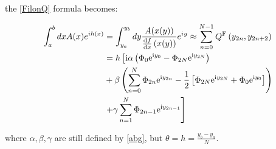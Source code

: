 the \eqref{FilonQ} formula becomes:

\begin{equation}
    \begin{aligned}
        \int_{a}^{b}dxA(x)e^{ih(x)} &= \int_{y_a}^{y_b}dy\frac{A(x(y))}{\dv{f}{x}\left(x(y)\right)}e^{iy} \approx \sum_{n=0}^{N-1} Q^{\text {F}}\left(y_{2 n}, y_{2 n+2}\right) \\
        &= h\left[\mathrm{i} \alpha\left(\Phi_{0} \mathrm{e}^{\mathrm{i}  y_{0}}-\Phi_{2 N} \mathrm{e}^{\mathrm{i}  y_{2 N}}\right)\right.\\
        &+\beta\left(\sum_{n=0}^{N} \Phi_{2 n} \mathrm{e}^{\mathrm{i}  y_{2 n}}-\frac{1}{2}\left[\Phi_{2 N} \mathrm{e}^{\mathrm{i}  y_{2 N}}+\Phi_{0} \mathrm{e}^{\mathrm{i}  y_{0}}\right]\right) \\
        &\left.+\gamma \sum_{n=1}^{N} \Phi_{2 n-1} \mathrm{e}^{\mathrm{i}  y_{2 n-1}}\right] \\
    \end{aligned} \label{FilonVarQ}
\end{equation} 


where $\alpha, \beta, \gamma$ are still defined by \eqref{abg}, but  $\theta=h=\frac{y_b-y_a}{N}$. 

